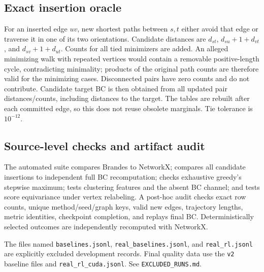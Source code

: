 \documentclass[11pt]{article}
\begin{document}
\subsection{Exact insertion oracle}
For an inserted edge $uv$, new shortest paths between $s,t$ either avoid that
edge or traverse it in one of its two orientations. Candidate distances are
$d_{st}$, $d_{su}+1+d_{vt}$, and $d_{sv}+1+d_{ut}$. Counts for all tied
minimizers are added. An alleged minimizing walk with repeated vertices would
contain a removable positive-length cycle, contradicting minimality; products
of the original path counts are therefore valid for the minimizing cases.
Disconnected pairs have zero counts and do not contribute. Candidate target
BC is then obtained from all updated pair distances/counts, including distances
to the target. The tables are rebuilt after each committed edge, so this does
not reuse obsolete marginals. Tie tolerance is $10^{-12}$.

\subsection{Source-level checks and artifact audit}
The automated suite compares Brandes to NetworkX; compares all candidate
insertions to independent full BC recomputation; checks exhaustive greedy's
stepwise maximum; tests clustering features and the absent BC channel; and
tests score equivariance under vertex relabeling. A post-hoc audit checks
exact row counts, unique method/seed/graph keys, valid new edges, trajectory
lengths, metric identities, checkpoint completion, and replays final BC.
Deterministically selected outcomes are independently recomputed with NetworkX.

The files named \texttt{baselines.jsonl}, \texttt{real\_baselines.jsonl}, and
\texttt{real\_rl.jsonl} are explicitly excluded development records. Final
quality data use the \texttt{v2} baseline files and
\texttt{real\_rl\_cuda.jsonl}. See \texttt{EXCLUDED\_RUNS.md}.
\end{document}
